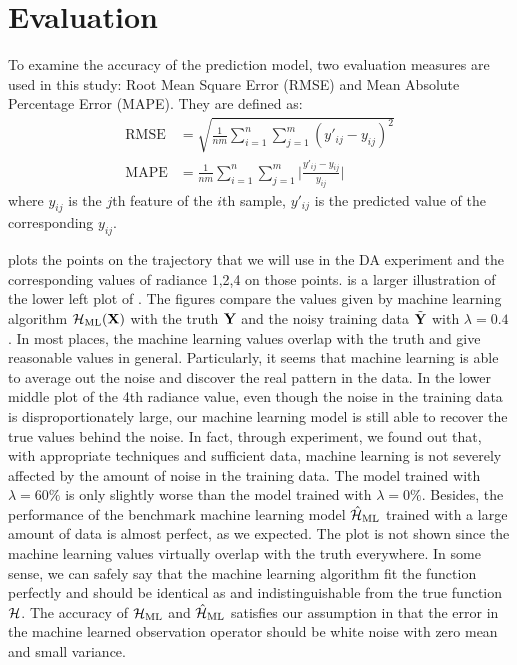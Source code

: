 \section{Evaluation}\label{sec:MLeval}
\par To examine the accuracy of the prediction model, two evaluation measures are used in this study: Root Mean Square Error (RMSE) and Mean Absolute Percentage Error (MAPE). They are defined as:
\begin{align}
\text{RMSE} & = \sqrt{\frac{1}{nm}\sum_{i=1}^n\sum_{j=1}^m(y'_{ij}-y_{ij})^2} \\
\text{MAPE} & = \frac{1}{nm}\sum_{i=1}^n\sum_{j=1}^m\bigg|\frac{y'_{ij}-y_{ij}}{y_{ij}}\bigg|
\end{align}
where $y_{ij}$ is the $j$th feature of the $i$th sample, $y'_{ij}$ is the predicted value of the corresponding $y_{ij}$.

\par {} plots the points on the trajectory that we will use in the DA experiment and the corresponding values of radiance 1,2,4 on those points.  is a larger illustration of the lower left plot of . The figures compare the values given by machine learning algorithm $\mathcal{H}_{\text{ML}}(\textbf{X})$ with the truth $\textbf{Y}$ and the noisy training data $\tilde{\textbf{Y}}$ with $\lambda=0.4$. In most places, the machine learning values overlap with the truth and give reasonable values in general. Particularly, it seems that machine learning is able to average out the noise and discover the real pattern in the data. In the lower middle plot of the 4th radiance value, even though the noise in the training data is disproportionately large, our machine learning model is still able to recover the true values behind the noise. In fact, through experiment, we found out that, with appropriate techniques and sufficient data, machine learning is not severely affected by the amount of noise in the training data. The model trained with $\lambda=60\%$ is only slightly worse than the model trained with $\lambda=0\%$. Besides, the performance of the benchmark machine learning model $\hat{\mathcal{H}}_{\text{ML}}$ trained with a large amount of data is almost perfect, as we expected. The plot is not shown since the machine learning values virtually overlap with the truth everywhere. In some sense, we can safely say that the machine learning algorithm fit the function perfectly and should be identical as and indistinguishable from the true function $\mathcal{H}$. The accuracy of $\mathcal{H}_{\text{ML}}$ and $\hat{\mathcal{H}}_{\text{ML}}$ satisfies our assumption in  that the error in the machine learned observation operator should be white noise with zero mean and small variance.

